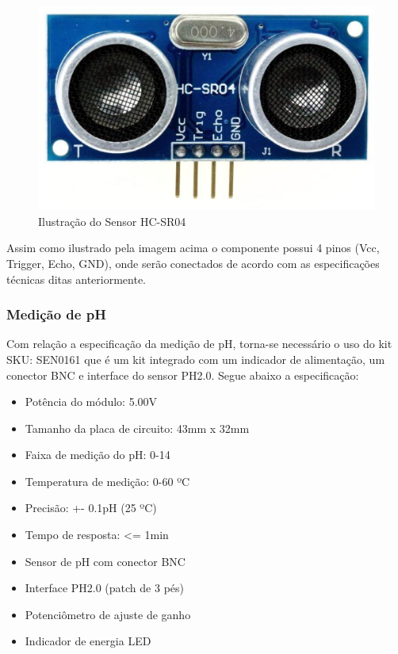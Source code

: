 \begin{figure}[h]
	\centering
	\includegraphics[keepaspectratio=true,scale=0.2]{figuras/sensor1.eps}
	\caption{Ilustração do Sensor HC-SR04}
	\label{sensor1}
\end{figure}

Assim como ilustrado pela imagem acima \nocite{MCP4725} o componente possui 4 pinos (Vcc, Trigger, Echo, GND), onde serão conectados de acordo com as especificações técnicas ditas anteriormente.

\subsubsection{Medição de pH}

  Com relação a especificação da medição de pH, torna-se necessário o uso do kit SKU: SEN0161 que é um kit integrado com um indicador de alimentação, um conector BNC e interface do sensor PH2.0. Segue abaixo a especificação: \nocite{HC-SR04}

\begin{itemize}
  \item Potência do módulo: 5.00V
  \item Tamanho da placa de circuito: 43mm x 32mm
  \item Faixa de medição do pH: 0-14
  \item Temperatura de medição: 0-60 ºC
  \item Precisão: +- 0.1pH (25 ºC)
  \item Tempo de resposta: <=   1min
  \item Sensor de pH com conector BNC
  \item Interface PH2.0 (patch de 3 pés)
  \item Potenciômetro de ajuste de ganho
  \item Indicador de energia LED
\end{itemize}


